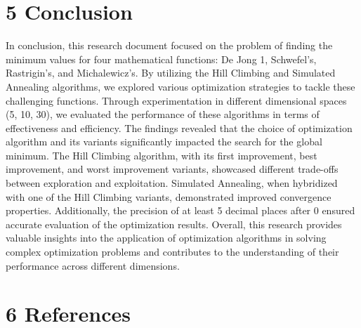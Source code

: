 \documentclass[10pt]{article}
\begin{document}
\section*{5 Conclusion}
In conclusion, this research document focused on the problem of finding the minimum values for four mathematical functions: De Jong 1, Schwefel's, Rastrigin's, and Michalewicz's. By utilizing the Hill Climbing and Simulated Annealing algorithms, we explored various optimization strategies to tackle these challenging functions. Through experimentation in different dimensional spaces (5, 10, 30), we evaluated the performance of these algorithms in terms of effectiveness and efficiency. The findings revealed that the choice of optimization algorithm and its variants significantly impacted the search for the global minimum. The Hill Climbing algorithm, with its first improvement, best improvement, and worst improvement variants, showcased different trade-offs between exploration and exploitation. Simulated Annealing, when hybridized with one of the Hill Climbing variants, demonstrated improved convergence properties. Additionally, the precision of at least 5 decimal places after 0 ensured accurate evaluation of the optimization results. Overall, this research provides valuable insights into the application of optimization algorithms in solving complex optimization problems and contributes to the understanding of their performance across different dimensions.

\section*{6 References}
\end{document}
